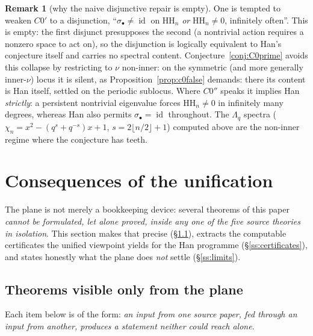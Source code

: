 \documentclass[11pt]{amsart}
\theoremstyle{definition}
\newtheorem{remark}[theorem]{Remark}
\newcommand{\HH}{\mathrm{HH}}
\newcommand{\id}{\operatorname{id}}
\begin{document}
\begin{remark}[why the naive disjunctive repair is empty]\label{rem:c0disjunction}
One is tempted to weaken $C0'$ to a disjunction, ``$\sigma_\bullet\ne\id$ on
$\HH_n$ \emph{or} $\HH_n\ne0$, infinitely often''. This is empty: the first
disjunct presupposes the second (a nontrivial action requires a nonzero space
to act on), so the disjunction is logically equivalent to Han's conjecture
itself and carries no spectral content. Conjecture~\ref{conj:C0prime} avoids
this collapse by restricting to $\nu$ non-inner: on the symmetric (and more
generally inner-$\nu$) locus it is silent, as Proposition~\ref{prop:c0false}
demands: there its content is Han itself, settled on the periodic
sublocus. Where $C0''$ speaks it implies Han \emph{strictly}: a persistent
nontrivial eigenvalue forces $\HH_n\ne0$ in infinitely many degrees, whereas
Han also permits $\sigma_\bullet=\id$ throughout. The $\Lambda_q$ spectra
($\chi_n=x^2-(q^s+q^{-s})x+1$, $s=2\lfloor n/2\rfloor+1$) computed above are the
non-inner regime where the conjecture has teeth.
\end{remark}

\section{Consequences of the unification}\label{sec:consequences}

The plane is not merely a bookkeeping device: several theorems of this paper
\emph{cannot be formulated, let alone proved, inside any one of the five source
theories in isolation}. This section makes that precise (\S\ref{ss:onlyplane}),
extracts the computable certificates the unified viewpoint
yields for the Han programme (\S\ref{ss:certificates}), and states honestly
what the plane does \emph{not} settle (\S\ref{ss:limits}).

\subsection{Theorems visible only from the plane}\label{ss:onlyplane}

Each item below is of the form: \emph{an input from one source paper, fed
through an input from another, produces a statement neither could reach alone.}
\end{document}
